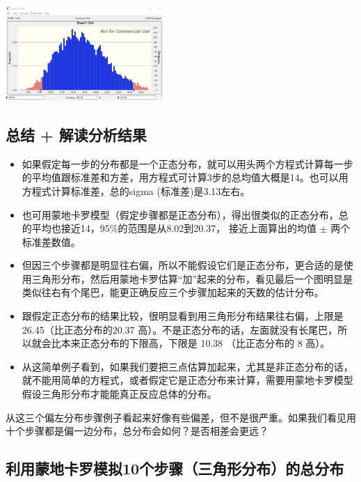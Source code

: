 \includegraphics[width=6cm]{pert32.png}

\hypertarget{ux603bux7ed3-ux89e3ux8bfbux5206ux6790ux7ed3ux679c}{%
\subsection{总结 +
解读分析结果}\label{ux603bux7ed3-ux89e3ux8bfbux5206ux6790ux7ed3ux679c}}

\begin{itemize}
\tightlist
\item
  如果假定每一步的分布都是一个正态分布，就可以用头两个方程式计算每一步的平均值跟标准差和方差，用方程式可计算3步的总均值大概是14。也可以用方程式计算标准差，总的sigma
  (标准差)是3.13左右。
\item
  也可用蒙地卡罗模型（假定步骤都是正态分布），得出很类似的正态分布，总的平均也接近14，95\%的范围是从8.02到20.37，
  接近上面算出的均值 \(\pm\) 两个标准差数值。
\item
  但因三个步骤都是明显往右偏，所以不能假设它们是正态分布，更合适的是使用三角形分布，然后用蒙地卡罗估算``加''起来的分布，看见最后一个图明显是类似往右有个尾巴，能更正确反应三个步骤加起来的天数的估计分布。
\item
  跟假定正态分布的结果比较，很明显看到用三角形分布结果往右偏，上限是
  26.45（比正态分布的20.37
  高）。不是正态分布的话，左面就没有长尾巴，所以就会比本来正态分布的下限高，下限是
  10.38 （比正态分布的 8 高）。
\item
  从这简单例子看到，如果我们要把三点估算加起来，尤其是非正态分布的话，就不能用简单的方程式，或者假定它是正态分布来计算，需要用蒙地卡罗模型假设三角形分布才能能真正反应总体的分布。\\
\end{itemize}

从这三个偏左分布步骤例子看起来好像有些偏差，但不是很严重。如果我们看见用十个步骤都是偏一边分布，总分布会如何？是否相差会更远？

\hypertarget{ux5229ux7528ux8499ux5730ux5361ux7f57ux6a21ux62df10ux4e2aux6b65ux9aa4ux4e09ux89d2ux5f62ux5206ux5e03ux7684ux603bux5206ux5e03}{%
\subsection{利用蒙地卡罗模拟10个步骤（三角形分布）的总分布}\label{ux5229ux7528ux8499ux5730ux5361ux7f57ux6a21ux62df10ux4e2aux6b65ux9aa4ux4e09ux89d2ux5f62ux5206ux5e03ux7684ux603bux5206ux5e03}}


